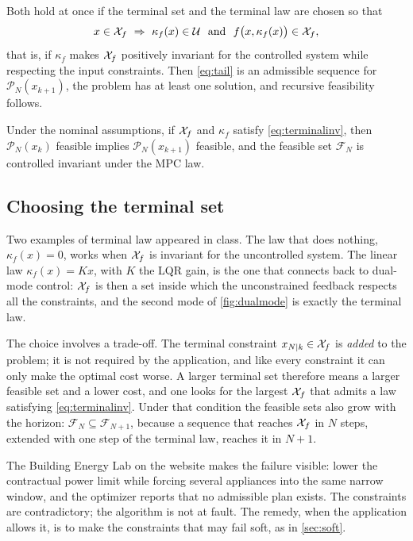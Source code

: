 Both hold at once if the terminal set and the terminal law are chosen so that
\begin{equation}
  x \in \Xf \ \Rightarrow\ \kappa_f(x) \in \U \ \text{ and }\ f\big(x,\kappa_f(x)\big) \in \Xf ,
  \label{eq:terminalinv}
\end{equation}
that is, if $\kappa_f$ makes $\mathcal{X}_f$ positively invariant for the controlled system while
respecting the input constraints. Then \eqref{eq:tail} is an admissible sequence for
$\mathcal{P}_N(x_{k+1})$, the problem has at least one solution, and recursive feasibility
follows.

\begin{theorem}
Under the nominal assumptions, if $\mathcal{X}_f$ and $\kappa_f$ satisfy \eqref{eq:terminalinv}, then
$\mathcal{P}_N(x_k)$ feasible implies $\mathcal{P}_N(x_{k+1})$ feasible, and the feasible set
$\mathcal{F}_N$ is controlled invariant under the MPC law.
\end{theorem}

\subsection{Choosing the terminal set}

Two examples of terminal law appeared in class. The law that does nothing, $\kappa_f(x) = 0$,
works when $\mathcal{X}_f$ is invariant for the uncontrolled system. The linear law $\kappa_f(x) = Kx$,
with $K$ the LQR gain, is the one that connects back to dual-mode control: $\mathcal{X}_f$ is then a set
inside which the unconstrained feedback respects all the constraints, and the second mode of
\cref{fig:dualmode} is exactly the terminal law.

The choice involves a trade-off. The terminal constraint $x_{{N|k}} \in \mathcal{X}_f$ is \emph{added}
to the problem; it is not required by the application, and like every constraint it can only
make the optimal cost worse. A larger terminal set therefore means a larger feasible set and a
lower cost, and one looks for the largest $\mathcal{X}_f$ that admits a law satisfying
\eqref{eq:terminalinv}. Under that condition the feasible sets also grow with the horizon:
$\mathcal{F}_N \subseteq \mathcal{F}_{N+1}$, because a sequence that reaches $\mathcal{X}_f$ in $N$ steps,
extended with one step of the terminal law, reaches it in $N+1$.

\begin{remark}
The Building Energy Lab on the website makes the failure visible: lower the contractual power
limit while forcing several appliances into the same narrow window, and the optimizer reports
that no admissible plan exists. The constraints are contradictory; the algorithm is not at
fault. The remedy, when the application allows it, is to make the constraints that may fail
soft, as in \cref{sec:soft}.
\end{remark}


